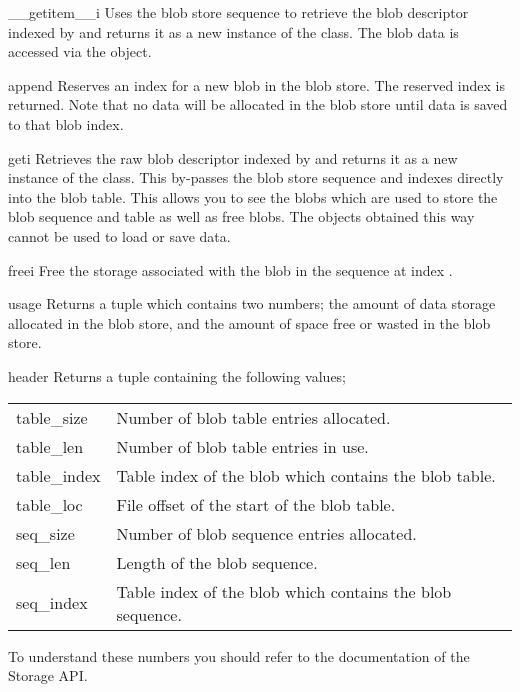 \begin{methoddesc}[BlobStore]{__getitem__}{i}
Uses the blob store sequence to retrieve the blob descriptor indexed
by  and returns it as a new instance of the  class.
The blob data is accessed via the  object.
\end{methoddesc}

\begin{methoddesc}[BlobStore]{append}{}
Reserves an index for a new blob in the blob store.  The reserved
index is returned.  Note that no data will be allocated in the blob
store until data is saved to that blob index.
\end{methoddesc}

\begin{methoddesc}[BlobStore]{get}{i}
Retrieves the raw blob descriptor indexed by  and returns it as
a new instance of the  class.  This by-passes the blob
store sequence and indexes directly into the blob table.  This allows
you to see the blobs which are used to store the blob sequence and
table as well as free blobs.  The  objects obtained this
way cannot be used to load or save data.
\end{methoddesc}

\begin{methoddesc}[BlobStore]{free}{i}
Free the storage associated with the blob in the sequence at index
.
\end{methoddesc}

\begin{methoddesc}[BlobStore]{usage}{}
Returns a tuple which contains two numbers; the amount of data storage
allocated in the blob store, and the amount of space free or wasted in
the blob store.
\end{methoddesc}

\begin{methoddesc}[BlobStore]{header}{}
Returns a tuple containing the following values;
\begin{longtable}{l|l}
table_size  & Number of blob table entries allocated. \\
table_len   & Number of blob table entries in use. \\
table_index & Table index of the blob which contains the blob table. \\
table_loc   & File offset of the start of the blob table. \\
seq_size    & Number of blob sequence entries allocated. \\
seq_len	    & Length of the blob sequence. \\
seq_index   & Table index of the blob which contains the blob sequence. \\
\end{longtable}

To understand these numbers you should refer to the documentation of
the Storage API.
\end{methoddesc}

